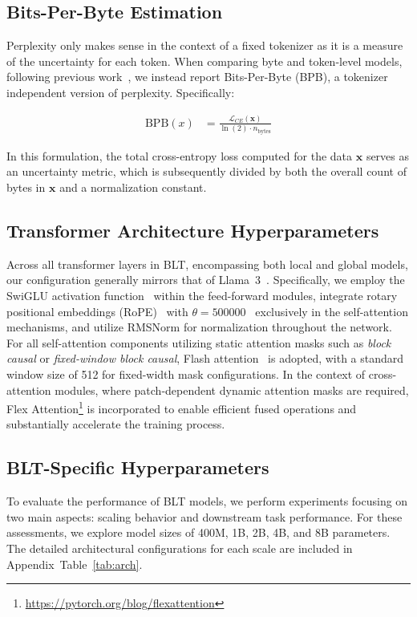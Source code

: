 \subsection{Bits-Per-Byte Estimation} Perplexity only makes sense in the context of a fixed tokenizer as it is a measure of the uncertainty for each token. When comparing byte and token-level models, following previous work~\citep{xue2022byt5, yu2023megabyte, wang2024mambabyte}, we instead report Bits-Per-Byte (BPB), a tokenizer independent version of perplexity. Specifically:

\begin{align}
    \text{BPB}(x)&= \frac{\mathcal{L}_{CE}(\pmb{x})}{\ln(2)\cdot n_{\text{bytes}}}
\end{align}

In this formulation, the total cross-entropy loss computed for the data $\pmb{x}$ serves as an uncertainty metric, which is subsequently divided by both the overall count of bytes in $\pmb{x}$ and a normalization constant.

\subsection{Transformer Architecture Hyperparameters} Across all transformer layers in {\textsc BLT}, encompassing both local and global models, our configuration generally mirrors that of Llama~3~\citep{dubey2024llama}. Specifically, we employ the SwiGLU activation function~\citep{swiglu} within the feed-forward modules, integrate rotary positional embeddings (RoPE)~\citep{RoPe} with $\theta=500000$~\citep{xiong2024effective} exclusively in the self-attention mechanisms, and utilize RMSNorm \citep{RMSNorm} for normalization throughout the network. For all self-attention components utilizing static attention masks such as \textit{block causal} or \textit{fixed-window block causal}, Flash attention~\citep{dao2022flashattention} is adopted, with a standard window size of 512 for fixed-width mask configurations. In the context of cross-attention modules, where patch-dependent dynamic attention masks are required, Flex Attention\footnote{\url{https://pytorch.org/blog/flexattention}} is incorporated to enable efficient fused operations and substantially accelerate the training process.

\subsection{{\textsc BLT}-Specific Hyperparameters} To evaluate the performance of {\textsc BLT} models, we perform experiments focusing on two main aspects: scaling behavior and downstream task performance. For these assessments, we explore model sizes of 400M, 1B, 2B, 4B, and 8B parameters. The detailed architectural configurations for each scale are included in Appendix~Table~\ref{tab:arch}.

